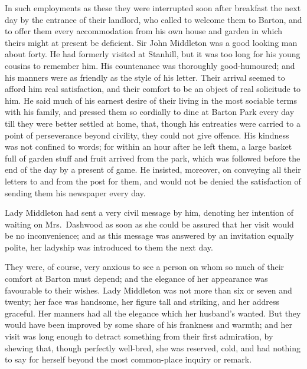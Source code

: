 In such employments as these they were interrupted
soon after breakfast the next day by the entrance of
their landlord, who called to welcome them to Barton,
and to offer them every accommodation from his own house
and garden in which theirs might at present be deficient.
Sir John Middleton was a good looking man about forty.
He had formerly visited at Stanhill, but it was too long
for his young cousins to remember him.  His countenance
was thoroughly good-humoured; and his manners were
as friendly as the style of his letter.  Their arrival
seemed to afford him real satisfaction, and their comfort
to be an object of real solicitude to him.  He said much
of his earnest desire of their living in the most sociable
terms with his family, and pressed them so cordially
to dine at Barton Park every day till they were better
settled at home, that, though his entreaties were carried
to a point of perseverance beyond civility, they could
not give offence.  His kindness was not confined to words;
for within an hour after he left them, a large basket
full of garden stuff and fruit arrived from the park,
which was followed before the end of the day by a present
of game.  He insisted, moreover, on conveying all their
letters to and from the post for them, and would not be
denied the satisfaction of sending them his newspaper
every day.

Lady Middleton had sent a very civil message by him,
denoting her intention of waiting on Mrs.\ Dashwood as soon as
she could be assured that her visit would be no inconvenience;
and as this message was answered by an invitation
equally polite, her ladyship was introduced to them the next day.

They were, of course, very anxious to see a person on
whom so much of their comfort at Barton must depend; and the
elegance of her appearance was favourable to their wishes.
Lady Middleton was not more than six or seven and twenty;
her face was handsome, her figure tall and striking,
and her address graceful.  Her manners had all the elegance
which her husband's wanted.  But they would have been
improved by some share of his frankness and warmth;
and her visit was long enough to detract something from
their first admiration, by shewing that, though perfectly
well-bred, she was reserved, cold, and had nothing to say
for herself beyond the most common-place inquiry or remark.

